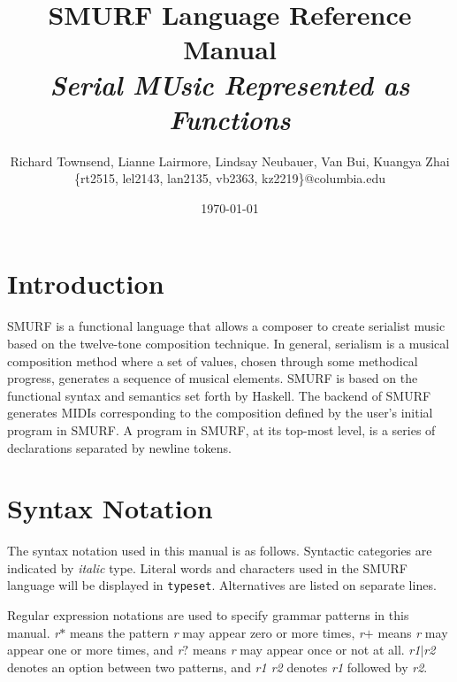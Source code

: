 \documentclass[dvips, 12pt]{article}
\title{{\Huge \bfseries SMURF Language Reference Manual} \\ \Large \it Serial MUsic Represented as Functions \vspace{0.6cm}}
\author{\normalsize Richard Townsend, Lianne Lairmore, Lindsay Neubauer, Van Bui, Kuangya Zhai
	\\ \small \{rt2515, lel2143, lan2135, vb2363, kz2219\}@columbia.edu \vspace{0.6cm}}
\date{\today \vspace{2cm}}
\begin{document}
\maketitle
\clearpage


\tableofcontents

\section{Introduction}
SMURF is a functional language that allows a composer to create serialist music
based on the twelve-tone composition technique. In general, serialism is a musical composition
method where a set of values, chosen through some methodical progress,
generates a sequence of musical elements. SMURF is based on the
functional syntax and semantics set forth by Haskell. The backend of
SMURF generates MIDIs corresponding to the composition defined by the 
user's initial program in SMURF. A program in SMURF, at its top-most level, 
is a series of declarations separated by newline tokens.

\section{Syntax Notation}
The syntax notation used in this manual is as follows. Syntactic 
categories are indicated by \emph{italic} type. Literal words and 
characters used in the SMURF language will be displayed in \texttt{typeset}. 
Alternatives are listed on separate lines. 

Regular expression notations are used to specify grammar patterns in this
manual.  {\it r}$*$ means the pattern {\it r} may appear zero or more times,
{\it r}$+$ means {\it r} may appear one or more times, and {\it r}$?$
means {\it r} may appear once or not at all. {\it r1}$|${\it r2} denotes an option
between two patterns, and {\it r1 r2} denotes {\it r1} followed by
{\it r2}. 







\clearpage
\end{document}
